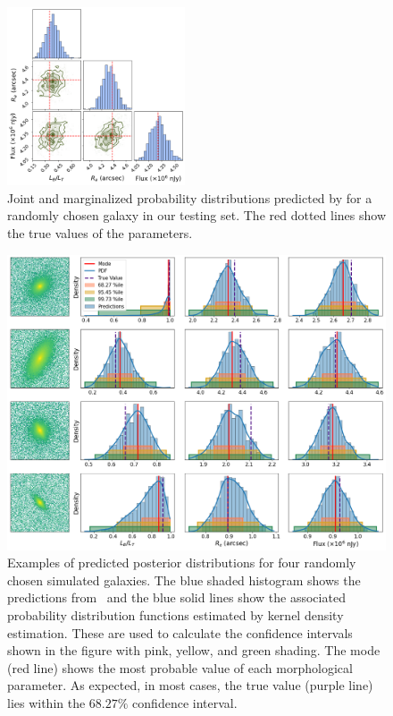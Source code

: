\begin{figure}[htb]
    \centering
    \includegraphics[width
    =0.47\textwidth]{corner.png}
    \caption{Joint and marginalized probability distributions predicted by \gampen{} for a randomly chosen galaxy in our testing set. The red dotted lines show the true values of the parameters.}
    \label{fig_c2:corner}
\end{figure}

\begin{figure}[htb]
    \centering
    \includegraphics[width
    =\textwidth]{example_predicted_distributions_2.png}
    \caption{Examples of predicted posterior distributions for four randomly chosen simulated galaxies. The blue shaded histogram shows the predictions from \gampen\, and the blue solid lines show the associated probability distribution functions estimated by kernel density estimation. These are used to calculate the confidence intervals shown in the figure with pink, yellow, and green shading. The mode (red line) shows the most probable value of each morphological parameter. As expected, in most cases, the true value (purple line) lies within the $68.27\%$ confidence interval.}
    \label{fig_c2:example_pred_dists}
\end{figure}

